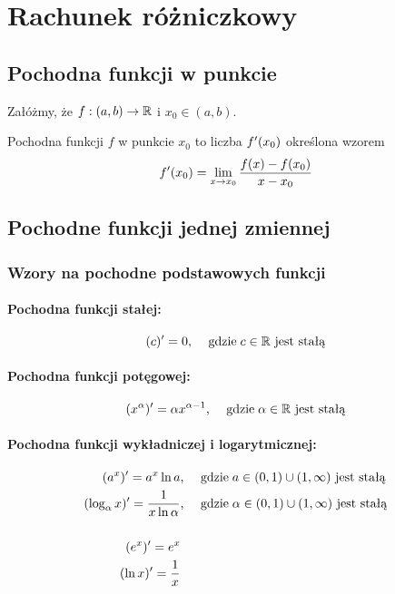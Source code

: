 \documentclass[../Matematyka.tex]{subfiles}
\begin{document}
    \section{Rachunek różniczkowy}

    \subsection{Pochodna funkcji w punkcie}
    Załóżmy, że \(f:(a, b) \rightarrow  \mathbb{R}\) i \(x_0 \in (a,b)\).\par
    Pochodna funkcji \(f\) w punkcie \(x_0\) to liczba \(f^\prime(x_0)\) określona wzorem
    \[f^\prime(x_0) = \lim\limits_{x \to x_0} \frac{f(x) - f(x_0)}{x-x_0}\]

    \subsection{Pochodne funkcji jednej zmiennej}

    \subsubsection{Wzory na pochodne podstawowych funkcji}

    \paragraph{Pochodna funkcji stałej:}
    \[ (c)^\prime = 0 \text{, \quad gdzie} \; c \in \mathbb{R} \text{ jest stałą} \]
    
    \paragraph{Pochodna funkcji potęgowej:}
    \[ (x^\alpha)^\prime = \alpha x^{\alpha-1} \text{, \quad gdzie} \; \alpha \in \mathbb{R} \text{ jest stałą} \]
    
    \paragraph{Pochodna funkcji wykładniczej i logarytmicznej:}
    \begin{align*}
        (a^x)^\prime = a^x \ln a &\text{, \quad gdzie} \; a \in (0, 1) \cup (1, \infty) \text{ jest stałą} \\
        (\log_\alpha x)^\prime = \frac{1}{x \ln \alpha} &\text{, \quad gdzie} \; \alpha \in (0, 1) \cup (1, \infty) \text{ jest stałą} \\
        \\
        (e^x)^\prime = e^x \\
        (\ln x)^\prime = \frac{1}{x}
    \end{align*}
\end{document}
